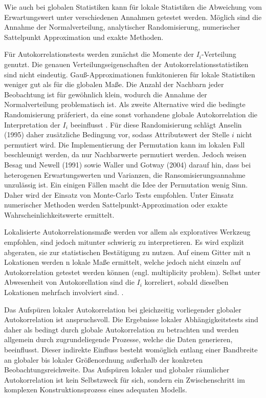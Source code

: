 Wie auch bei globalen Statistiken kann für lokale Statistiken die Abweichung vom Erwartungswert unter verschiedenen Annahmen getestet werden. 
Möglich sind die Annahme der Normalverteilung, analytischer Randomisierung, numerischer Sattelpunkt Approximation und exakte Methoden. 

Für Autokorrelationstests werden zunächst die Momente der $I_i$-Verteilung genutzt. 
Die genauen Verteilungseigenschaften der Autokorrelationsstatistiken sind nicht eindeutig. 
Gauß-Approximationen funkitonieren für lokale Statistiken weniger gut als für die globalen Maße. 
Die Anzahl der Nachbarn jeder Beobachtung ist für gewöhnlich klein, wodurch die Annahme der Normalverteilung problematisch ist. 
Als zweite Alternative wird die bedingte Randomisierung präferiert, 
da eine sonst vorhandene globale Autokorrelation die Interpretation der $I_i$ beeinflusst \cite[S. 271]{fischer_handbook_2010}.
Für diese Randomisierung schlägt Anselin (1995) daher zusätzliche Bedingung vor, sodass Attributswert der Stelle $i$ nicht permutiert wird. 
Die Implementierung der Permutation kann im lokalen Fall beschleunigt werden, da nur Nachbarwerte permutiert werden. 
Jedoch weisen Besag und Newell (1991) sowie Waller und Gotway (2004) darauf hin, dass 
bei heterogenen Erwartungswerten und Varianzen, die Ransomisierungsannahme unzulässig ist. 
Ein einigen Fällen macht die Idee der Permutation wenig Sinn. Daher wird der Einsatz von Monte-Carlo Tests empfohlen.
Unter Einsatz numerischer Methoden werden Sattelpunkt-Approximation oder exakte Wahrscheinlichkeitswerte ermittelt.

Lokalisierte Autokorrelationsmaße werden vor allem als exploratives Werkzeug empfohlen, sind jedoch mitunter schwierig zu interpretieren. 
Es wird explizit abgeraten, sie zur statistischen Bestätigung zu nutzen. 
Auf einem Gitter mit n Lokationen werden n lokale Maße ermittelt, welche jedoch nicht einzeln auf Autokorrelation getestet werden können (engl. multiplicity problem). 
Selbst unter Abwesenheit von Autokorellation sind die $I_i$ korreliert, sobald dieselben Lokationen mehrfach involviert sind. \cite[S. 25]{schabenberger_statistical_2005}.


Das Aufspüren lokaler Autokorrelation bei gleichzeitig vorliegender globaler Autokorrelation ist anspruchsvoll. 
Die Ergebnisse lokaler Abhängigkeitstests sind daher als bedingt durch globale Autokorrelation zu betrachten 
und werden allgemein durch zugrundeliegende Prozesse, welche die Daten generieren, beeinflusst. 
Dieser indirekte Einfluss besteht womöglich entlang einer Bandbreite an globaler bis lokaler 
Größenordnung außerhalb der konkreten Beobachtungsreichweite.
Das Aufspüren lokaler und globaler räumlicher Autokorrelation ist kein Selbstzweck für sich, sondern ein Zwischenschritt im komplexen Konstruktionsprozess eines adequaten Modells.
